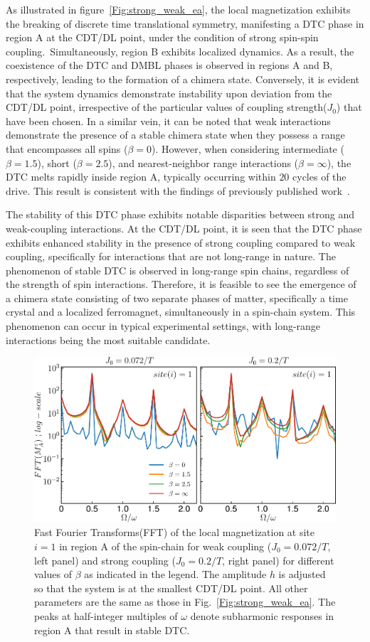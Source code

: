 \documentclass[12pt]{iopart}
\begin{document}
As illustrated in figure~\ref{Fig:strong_weak_ea}, the local magnetization exhibits the breaking of discrete time translational symmetry, manifesting a DTC phase in region A at the CDT/DL point, under the condition of strong spin-spin coupling. Simultaneously, region B exhibits localized dynamics. As a result, the coexistence of the DTC and DMBL phases is observed in regions A and B, respectively, leading to the formation of a chimera state. Conversely, it is evident that the system dynamics demonstrate instability upon deviation from the CDT/DL point, irrespective of the particular values of coupling strength($J_0$) that have been chosen. In a similar vein, it can be noted that weak interactions demonstrate the presence of a stable chimera state when they possess a range that encompasses all spins ($\beta=0$). However, when considering intermediate ($\beta = 1.5$), short ($\beta = 2.5$), and nearest-neighbor range interactions ($\beta = \infty$), the DTC melts rapidly inside region A, typically occurring within $20$ cycles of the drive. This result is consistent with the findings of previously published work~\cite{sakurai_phys_nodate}.
	
The stability of this DTC phase exhibits notable disparities between strong and weak-coupling interactions. At the CDT/DL point, it is seen that the DTC phase exhibits enhanced stability in the presence of strong coupling compared to weak coupling, specifically for interactions that are not long-range in nature. The phenomenon of stable DTC is observed in long-range spin chains, regardless of the strength of spin interactions. Therefore, it is feasible to see the emergence of a chimera state consisting of two separate phases of matter, specifically a time crystal and a localized ferromagnet, simultaneously in a spin-chain system. This phenomenon can occur in typical experimental settings, with long-range interactions being the most suitable candidate.
\begin{figure}[t!]
\centering
\includegraphics[width=10.cm]{figure5.pdf}
\caption{Fast Fourier Transforms(FFT) of the local magnetization at site $i=1$ in region A of the spin-chain for weak coupling ($J_0 = 0.072/T$, left panel) and strong coupling ($J_0 = 0.2/T$, right panel) for different values of $\beta$ as indicated in the legend. The amplitude $h$ is adjusted so that the system is at the smallest CDT/DL point. All other parameters are the same as those in Fig.~\ref{Fig:strong_weak_ea}. The peaks at half-integer multiples of $\omega$ denote subharmonic responses in region A that result in stable DTC.}
\label{Fig:sz_single}
\end{figure}
	
\end{document}
